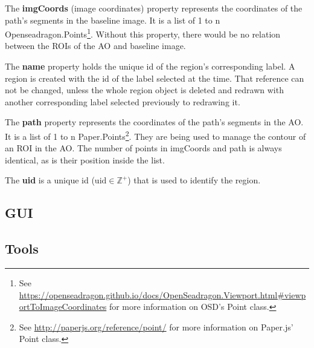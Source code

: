 The \textbf{imgCoords} (image coordinates) property represents the coordinates of the path's segments in the baseline image. It is a list of 1 to n Openseadragon.Points\footnote{
	See \url{https://openseadragon.github.io/docs/OpenSeadragon.Viewport.html\#viewportToImageCoordinates} for more information on OSD's Point class.
}.
Without this property, there would be no relation between the ROIs of the AO and baseline image.

The \textbf{name} property holds the unique id of the region's corresponding label. A region is created with the id of the label selected at the time. That reference can not be changed, unless the whole region object is deleted and redrawn with another corresponding label selected previously to redrawing it.

The \textbf{path} property represents the coordinates of the path's segments in the AO. It is a list of 1 to n Paper.Points\footnote{
	See \url{http://paperjs.org/reference/point/} for more information on Paper.js' Point class.
}. They are being used to manage the contour of an ROI in the AO. The number of points in imgCoords and path is always identical, as is their position inside the list.

The \textbf{uid} is a unique id ($\text{uid} \in \mathbb{Z}^{+}$) that is used to identify the region.

\subsection{GUI}
\subsection{Tools}